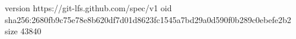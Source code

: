 version https://git-lfs.github.com/spec/v1
oid sha256:2680fb9c75e78e8b620df7d01d8623fc1545a7bd29a0d590f0b289c0ebefe2b2
size 43840
